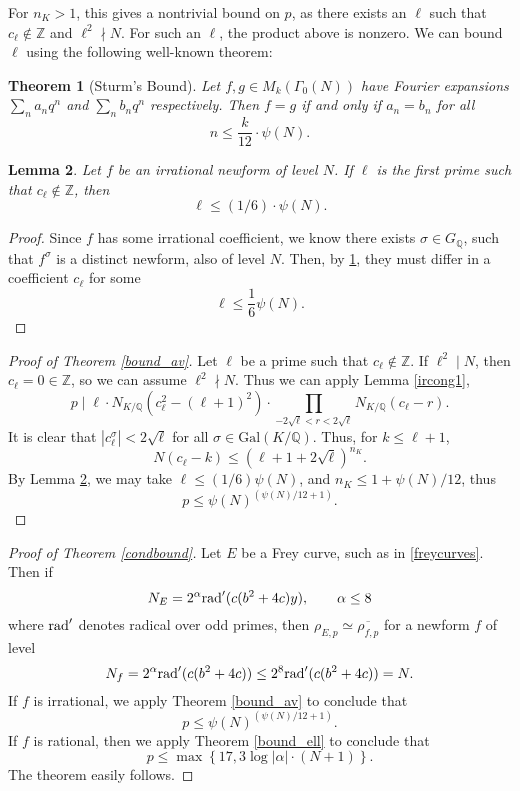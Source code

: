 \documentclass[12pt]{amsart}
\newtheorem{thm}{Theorem}[section]
\newtheorem{lem}[thm]{Lemma}
\theoremstyle{definition}
\def\Q{{\mathbb Q}}
\def\Z{{\mathbb Z}}
\newcommand{\rad}{{\rm{rad}}}
\renewcommand{\bar}{\overline}
\newcommand{\notdiv}{\nmid}
\newcommand{\Gal}{\text{Gal}}
\begin{document}
For $n_K > 1$, this gives a nontrivial bound on $p$, as there exists an $\ell$ such that $c_\ell \notin \mathbb{Z}$ and $\ell^2 \nmid N$. For such an $\ell$, the product above is nonzero. We can bound $\ell$ using the following well-known theorem:
\begin{thm}[Sturm's Bound]\label{sturm}
Let $f,g \in M_k(\Gamma_0(N))$ have Fourier expansions $\sum_n a_nq^n$ and $\sum_n b_n q^n$ respectively.  Then $f = g$ if and only if $a_n = b_n$ for all
\[ n \leq \frac{k}{12} \cdot \psi(N). \]
\end{thm}

\begin{lem}\label{boundell}
Let $f$ be an irrational newform of level $N$.  If $\ell$ is the first prime such that $c_\ell \not\in \Z$, then
\[ \ell \leq (1/6) \cdot \psi(N) .\]
\end{lem}

\begin{proof}
Since $f$ has some irrational coefficient, we know there exists $\sigma \in G_\Q$, such that $f^{\sigma}$ is a distinct newform, also of level $N$.  Then, by \ref{sturm}, they must differ in a coefficient $c_\ell$ for some 
\[ \ell \leq \frac{1}{6} \psi(N). \]
\end{proof}

\begin{proof}[Proof of Theorem \ref{bound_av}]
Let $\ell$ be a prime such that $c_\ell \notin \Z$.  If $\ell^2 \mid N$, then $c_\ell = 0 \in \Z$, so we can assume $\ell^2 \notdiv N$. Thus we can apply Lemma \ref{ircong1}, 
\[ p \mid \ell \cdot N_{K / \mathbb{Q}}(c_\ell^2-(\ell+1)^2) \cdot \prod_{-2\sqrt{\ell} < r < 2\sqrt{\ell}}{N_{K / \mathbb{Q}}}(c_\ell - r).\]
It is clear that $|c_\ell^{\sigma}| < 2\sqrt{\ell}$ for all $\sigma \in \Gal(K/\Q)$. Thus, for $k \leq \ell+1$, \[N(c_\ell - k) \leq (\ell+1 + 2\sqrt{\ell})^{n_{K}}.\] 
By Lemma \ref{boundell}, we may take $\ell \leq (1/6)\psi(N)$, and $n_{K} \leq 1+\psi(N)/12$, thus
\[ p \leq \psi(N)^{(\psi(N)/12+1)}. \]
\end{proof}
 
 
 \begin{proof}[Proof of Theorem \ref{condbound}]
 Let $E$ be a Frey curve, such as in \ref{freycurves}.  Then if
 \[N_E = 2^\alpha {\rad}'(c(b^2+4c)y), \qquad \alpha \leq 8\]
where ${\rad}'$ denotes radical over odd primes, then $\rho_{E,p} \simeq \bar{\rho_{f,p}}$ for a newform $f$ of level
\[N_f =  2^\alpha {\rad}'(c(b^2+4c))\leq 2^8  {\rad}'(c(b^2+4c)) = N.\]
 If $f$ is irrational, we apply Theorem \ref{bound_av} to conclude that
 \[ p \leq \psi(N)^{(\psi(N)/12+1)}. \]
 If $f$ is rational, then we apply Theorem \ref{bound_ell} to conclude that
 \[ p \leq \max\left\{ 17, 3 \log|\alpha| \cdot (N+1) \right\}. \]
 The theorem easily follows.
 \end{proof}
 
\end{document}
